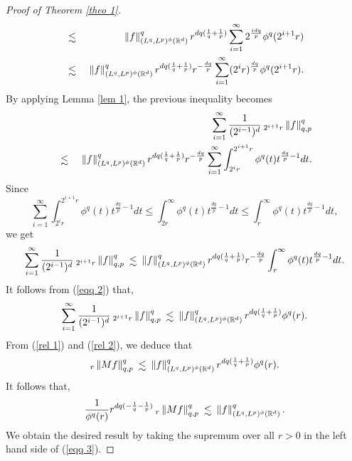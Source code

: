 \documentclass[a4paper,12pt,intlimits,oneside]{amsart}
\numberwithin{equation}{section}
\numberwithin{equation}{section}
\def\lsim{\raisebox{-1ex}{$~\stackrel{\textstyle <}{\sim}~$}}
\theoremstyle{definition}
\begin{document}
\begin{proof}[Proof of Theorem \ref{theo 1}]
\begin{eqnarray*}
&\lsim &\left\Vert f \right\Vert^{q}_{(L^{q},L^{p})^{\phi }(\mathbb{R}^{d})}r^{dq(\frac{1}{q}+\frac{1}{p})}  \sum^{\infty}_{i=1} 2^{\frac{idq}{p}} \phi^{q}(2^{i+1}r)  \\
&\lsim &\left\Vert f \right\Vert^{q}_{(L^{q},L^{p})^{\phi }(\mathbb{R}^{d})}r^{dq(\frac{1}{q}+\frac{1}{p})} r^{-\frac{dq}{p}} \sum^{\infty}_{i=1} (2^{i}r)^{\frac{dq}{p}} \phi^{q}(2^{i+1}r) .
\end{eqnarray*}
By applying Lemma \ref{lem 1}, the previous inequality becomes
\begin{eqnarray*}
&&\sum^{\infty}_{i=1} \frac{1}{(2^{i-1})^{d}}  \: _{2^{i+1}r}\left\|f\right\|^{q}_{q,p} \\
&\lsim & \left\Vert f \right\Vert^{q}_{(L^{q},L^{p})^{\phi }(\mathbb{R}^{d})}r^{dq(\frac{1}{q}+\frac{1}{p})} r^{-\frac{dq}{p}} \sum^{\infty}_{i=1} \displaystyle\int_{2^{i}r}^{2^{i+1}r} \phi^{q}(t)t^{\frac{dq}{p}-1} dt. 
\end{eqnarray*}
Since $$\sum\limits^{\infty}_{i=1} \displaystyle\int_{2^{i}r}^{2^{i+1}r} \phi^{q}(t)t^{\frac{dq}{p}-1} dt \leq  \displaystyle\int_{2r}^{\infty} \phi^{q}(t)t^{\frac{dq}{p}-1} dt \leq \displaystyle\int_{r}^{\infty} \phi^{q}(t)t^{\frac{dq}{p}-1} dt, $$
we get $$\sum^{\infty}_{i=1} \frac{1}{(2^{i-1})^{d}}  \: _{2^{i+1}r}\left\|f\right\|^{q}_{q,p} \lsim  \left\Vert f \right\Vert^{q}_{(L^{q},L^{p})^{\phi }(\mathbb{R}^{d})}r^{dq(\frac{1}{q}+\frac{1}{p})} r^{-\frac{dq}{p}} \displaystyle\int_{r}^{\infty} \phi^{q}(t)t^{\frac{dq}{p}-1} dt.  $$
It follows from (\ref{eqq 2}) that, 
\begin{equation}\label{rel 2}
\sum^{\infty}_{i=1} \frac{1}{(2^{i-1})^{d}}  \: _{2^{i+1}r}\left\|f\right\|^{q}_{q,p} \lsim \left\Vert f \right\Vert^{q}_{(L^{q},L^{p})^{\phi }(\mathbb{R}^{d})}r^{dq(\frac{1}{q}+\frac{1}{p})} \phi^{q}(r).
\end{equation}
From (\ref{rel 1}) and (\ref{rel 2}),  we deduce that $$_{r}\left\|Mf\right\|^{q}_{q,p} \lsim \left\Vert f \right\Vert^{q}_{(L^{q},L^{p})^{\phi }(\mathbb{R}^{d})}r^{dq(\frac{1}{q}+\frac{1}{p})} \phi^{q}(r).$$
It follows that, 
\begin{equation} \label{eqq 3} 
\frac{1}{\phi^{q}(r)}r^{dq(-\frac{1}{q}-\frac{1}{p})} \: _{r}\left\|Mf\right\|^{q}_{q,p} \lsim \left\Vert f \right\Vert^{q}_{(L^{q},L^{p})^{\phi }(\mathbb{R}^{d})}.
\end{equation}
We obtain the desired result by taking the supremum over all $ r > 0 $ in
the left hand side of (\ref{eqq 3}).
\end{proof}
\end{document}
